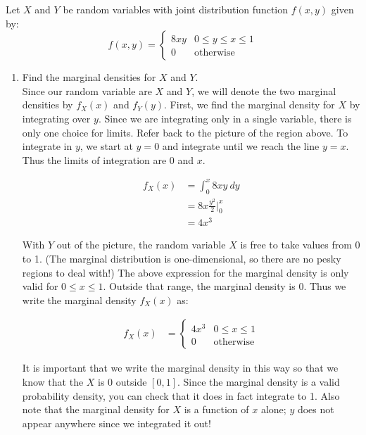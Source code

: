 \documentclass[notes.tex]{subfiles}
\begin{document}
\begin{example}
Let $X$ and $Y$ be random variables with joint distribution function $f(x, y)$ given by:
\[
f(x, y) = \begin{cases} 
      8 x y  & 0 \leq y \leq x \leq 1 \\
      0 & \textrm{otherwise}
   \end{cases}
\]
\begin{enumerate}
\item Find the marginal densities for $X$ and $Y$.\\

Since our random variable are $X$ and $Y$, we will denote the two marginal densities by $f_X(x)$ and $f_Y(y)$. First, we find the marginal density for $X$ by integrating over $y$. Since we are integrating only in a single variable, there is only one choice for limits. Refer back to the picture of the region above. To integrate in $y$, we start at $y = 0$ and integrate until we reach the line $y = x$. Thus the limits of integration are 0 and $x$.

\begin{align*}
f_X(x) &= \int_0^x 8 x y \: dy \\
&= 8x \frac{y^2}{2} \Bigr|_0^x \\
&= 4 x^3
\end{align*}

With $Y$ out of the picture, the random variable $X$ is free to take values from 0 to 1. (The marginal distribution is one-dimensional, so there are no pesky regions to deal with!) The above expression for the marginal density is only valid for $0 \leq x \leq 1$. Outside that range, the marginal density is 0. Thus we write the marginal density $f_X(x)$ as:

\begin{align*}
f_X(x) &= \begin{cases}
  4 x^3 & 0 \leq x \leq 1 \\
  0 & \textrm{otherwise}
   \end{cases}
\end{align*}

It is important that we write the marginal density in this way so that we know that the $X$ is 0 outside $[0, 1]$. Since the marginal density is a valid probability density, you can check that it does in fact integrate to 1. Also note that the marginal density for $X$ is a function of $x$ alone; $y$ does not appear anywhere since we integrated it out!\\


\end{enumerate}
\end{example}
\end{document}
